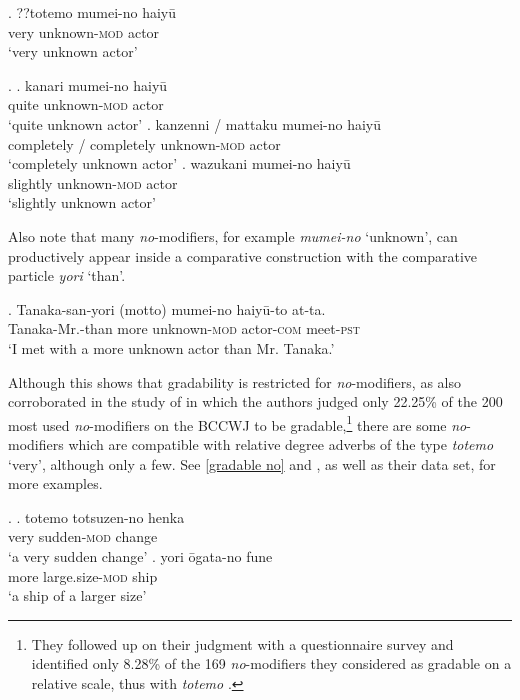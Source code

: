 \documentclass [output=book,colorlinks,citecolor=brown]{langscibook}
\begin{document}
\exg. ??totemo mumei-no haiyū\\
very unknown-\textsc{mod} actor\\
`very unknown actor’ \label{totemo mumei}

\ex. \label{kanari mumei} \ag. kanari mumei-no haiyū\\
quite unknown-\textsc{mod} actor\\
`quite unknown actor'
\bg. kanzenni / mattaku mumei-no haiyū\\
completely / completely unknown-\textsc{mod} actor\\
`completely unknown actor'
\cg. wazukani mumei-no haiyū\\
slightly unknown-\textsc{mod} actor\\
`slightly unknown actor' \label{wazukani mumei-no}

Also note that many \textit{no}-modifiers, for example \textit{mumei-no} `unknown’, can productively appear inside a comparative construction with the comparative particle \textit{yori} `than’.

\newpage

\exg. Tanaka-san-yori (motto) mumei-no haiyū-to at-ta.\\
Tanaka-Mr.-than more unknown-\textsc{mod} actor-\textsc{com} meet-\textsc{pst}\\
`I met with a more unknown actor than Mr. Tanaka.’

Although this shows that gradability is restricted for \textit{no}-modifiers, as also corroborated in the study of \citet{oshima:2019:gradability} in which the authors judged only 22.25\% of the 200 most used \textit{no}-modifiers on the BCCWJ to be gradable,\footnote{They followed up on their judgment with a questionnaire survey and identified only 8.28\% of the 169 \textit{no}-modifiers they considered as gradable on a relative scale, thus with \textit{totemo} \citep[29]{oshima:2019:gradability}.} there are some \textit{no}-modifiers which are compatible with relative degree adverbs of the type \textit{totemo} `very’, although only a few. See \ref{gradable no} and \citet{oshima:2019:gradability}, as well as their data set, for more examples. %

\ex. \label{gradable no} \ag. totemo totsuzen-no henka\\
very sudden-\textsc{mod} change\\
`a very sudden change’
\bg. yori ōgata-no fune\\
more large.size-\textsc{mod} ship\\
`a ship of a larger size’ \null \hfill \citep[16]{oshima:2019:gradability}
\end{document}
